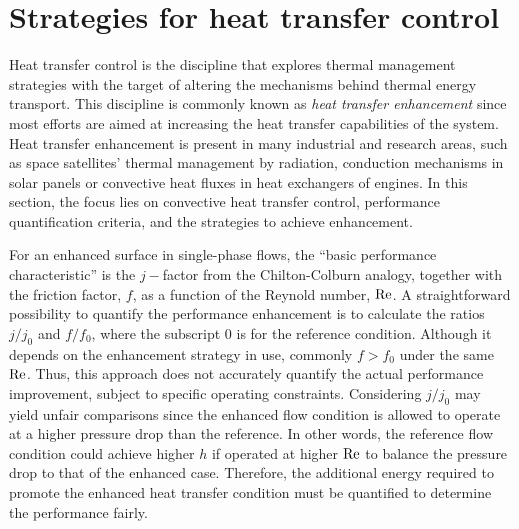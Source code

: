 \section{Strategies for heat transfer control}

Heat transfer control is the discipline that explores thermal management strategies with the target of altering the mechanisms behind thermal energy transport. This discipline is commonly known as \textit{heat transfer enhancement} since most efforts are aimed at increasing the heat transfer capabilities of the system. Heat transfer enhancement is present in many industrial and research areas, such as space satellites' thermal management by radiation, conduction mechanisms in solar panels or convective heat fluxes in heat exchangers of engines. In this section, the focus lies on convective heat transfer control, performance quantification criteria, and the strategies to achieve enhancement. 

For an enhanced surface in single-phase flows, the ``basic performance characteristic'' is the $j-$factor from the Chilton-Colburn analogy, together with the friction factor, $f$, as a function of the Reynold number, $\mbox{$\mathrm{Re}$}$. A straightforward possibility to quantify the performance enhancement is to calculate the ratios $j/j_0$ and $f/f_0$, where the subscript $0$ is for the reference condition. Although it depends on the enhancement strategy in use, commonly $f > f_0$ under the same $\mbox{$\mathrm{Re}$}$. Thus, this approach does not accurately quantify the actual performance improvement, subject to specific operating constraints. Considering $j/j_0$ may yield unfair comparisons since the enhanced flow condition is allowed to operate at a higher pressure drop than the reference. In other words, the reference flow condition could achieve higher $h$ if operated at higher $\mbox{$\mathrm{Re}$}$ to balance the pressure drop to that of the enhanced case. Therefore, the additional energy required to promote the enhanced heat transfer condition must be quantified to determine the performance fairly.


